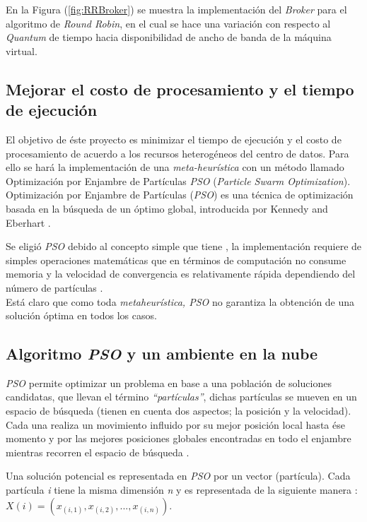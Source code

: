 En la Figura (\ref{fig:RRBroker}) se muestra la implementación del \textit{Broker} para el algoritmo de \textit{Round Robin}, en el cual se hace una variación con respecto al \textit{Quantum} de tiempo hacia disponibilidad de ancho de banda de la máquina virtual.


\subsection{Mejorar el costo de procesamiento y el tiempo de ejecución}

El objetivo de éste proyecto es minimizar el tiempo de ejecución y el costo de procesamiento de acuerdo a los recursos heterogéneos del centro de datos. Para ello se hará la  implementación de una \textit{meta-heurística} con un método llamado Optimización por Enjambre de Partículas \textit{PSO} (\textit{Particle Swarm Optimization}).\\

Optimización por Enjambre de Partículas (\textit{PSO}) es una técnica de optimización basada en la búsqueda de un óptimo global, introducida por Kennedy and Eberhart \cite{pandey2010}. 

Se eligió  \textit{PSO} debido al concepto simple que tiene \cite{poli2007},  la implementación requiere de simples operaciones matemáticas que en términos de computación no consume memoria  y la velocidad de convergencia es relativamente rápida dependiendo del número de partículas \cite{eberhart1995}.\\ 
Está claro que como toda \textit{metaheurística, PSO} no garantiza la obtención de una solución óptima en todos los casos.\cite{osman2012}

\subsection*{Algoritmo \textit{PSO} y un ambiente en la nube}
\textit{PSO} permite optimizar un problema en base a una población de soluciones candidatas, que llevan el término \textit{“partículas”}, dichas partículas se mueven en un espacio de búsqueda (tienen en cuenta dos aspectos; la posición y la velocidad). Cada una realiza un movimiento influido por su mejor posición local hasta ése momento y por las mejores posiciones globales encontradas en todo el enjambre mientras recorren el espacio de búsqueda \cite{poli2007}.

Una solución potencial es representada en \textit{PSO} por un vector (partícula). Cada partícula \textit{i} tiene la misma dimensión \textit{n} y es representada de la siguiente manera \cite{pandey2010}:$X(i) = (x_{(i,1)},x_{(i,2)},...,x_{(i,n)})  $.

